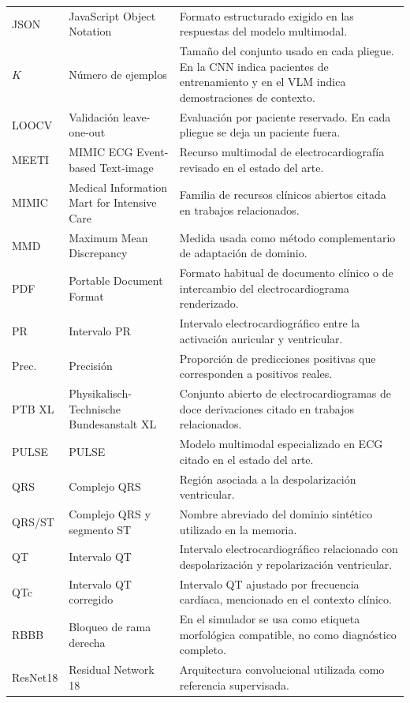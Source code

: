 {\begin{longtable}{@{}>{\raggedright\arraybackslash}p{2.20cm}>{\raggedright\arraybackslash}p{4.10cm}>{\raggedright\arraybackslash}p{7.95cm}@{}}
JSON & JavaScript Object Notation & Formato estructurado exigido en las respuestas del modelo multimodal. \\
\(K\) & Número de ejemplos & Tamaño del conjunto usado en cada pliegue. En la CNN indica pacientes de entrenamiento y en el VLM indica demostraciones de contexto. \\
LOOCV & Validación leave-one-out & Evaluación por paciente reservado. En cada pliegue se deja un paciente fuera. \\
MEETI & MIMIC ECG Event-based Text-image & Recurso multimodal de electrocardiografía revisado en el estado del arte. \\
MIMIC & Medical Information Mart for Intensive Care & Familia de recursos clínicos abiertos citada en trabajos relacionados. \\
MMD & Maximum Mean Discrepancy & Medida usada como método complementario de adaptación de dominio. \\
PDF & Portable Document Format & Formato habitual de documento clínico o de intercambio del electrocardiograma renderizado. \\
PR & Intervalo PR & Intervalo electrocardiográfico entre la activación auricular y ventricular. \\
Prec. & Precisión & Proporción de predicciones positivas que corresponden a positivos reales. \\
PTB XL & Physikalisch-Technische Bundesanstalt XL & Conjunto abierto de electrocardiogramas de doce derivaciones citado en trabajos relacionados. \\
PULSE & PULSE & Modelo multimodal especializado en ECG citado en el estado del arte. \\
QRS & Complejo QRS & Región asociada a la despolarización ventricular. \\
QRS/ST & Complejo QRS y segmento ST & Nombre abreviado del dominio sintético utilizado en la memoria. \\
QT & Intervalo QT & Intervalo electrocardiográfico relacionado con despolarización y repolarización ventricular. \\
QTc & Intervalo QT corregido & Intervalo QT ajustado por frecuencia cardíaca, mencionado en el contexto clínico. \\
RBBB & Bloqueo de rama derecha & En el simulador se usa como etiqueta morfológica compatible, no como diagnóstico completo. \\
ResNet18 & Residual Network 18 & Arquitectura convolucional utilizada como referencia supervisada. \\

\end{longtable}}
